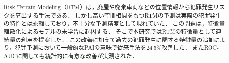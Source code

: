 \usepackage{color}
\usepackage{url}
\usepackage{doi}
\usepackage{lmodern}
\usepackage{amsmath}
\usepackage{mathtools}
\usepackage{amsthm}
\usepackage{amssymb}
\usepackage{booktabs}
\usepackage[dvipdfmx]{graphicx}
\usepackage{listings}
\usepackage{float} 
\usepackage{placeins}
\usepackage[nameinlink]{cleveref}
\usepackage{subcaption}

\usepackage{lipsum}

\let\OLDthebibliography\thebibliography
\renewcommand\thebibliography[1]{
  \OLDthebibliography{#1}
  \setlength{\parskip}{0pt}
  \setlength{\itemsep}{0pt plus 0.3ex}
}


\newcommand{\yj}[1]{{#1}^{(\lambda)}}
\newcommand{\yjj}[1]{{#1}^{(\lambda_j)}}
\newcommand{\yjs}[1]{{#1}^{(\lambda*)}}
\newcommand{\tr}[1]{{#1}^\top}
\newcommand{\yjv}{\xi}
\newcommand{\real}{\mathbb{R}}
\newcommand{\cfsq}{$\text{CF}^2$}

\title{
}


\author{%
\and
{}
}



\begin{abstract}
Risk Terrain Modeling（RTM）は，廃屋や廃棄車両などの位置情報から犯罪発生リスクを算出する手法である．
しかし高い空間相関をもつRTMの予測は実際の犯罪発生の特性とは乖離しており，不十分な予測精度として現れていた．
この問題は，特徴量離散化によるモデルの未学習に起因する．
そこで本研究ではRTMの特徴量として連続量の利用を提案した．
この改善に加えて過去の犯罪発生に関する特徴量の追加により，犯罪予測において一般的なPAIの意味で従来手法を24.5\%改善した．
またROC-AUCに関しても統計的に有意な改善が実現された．
\end{abstract}


